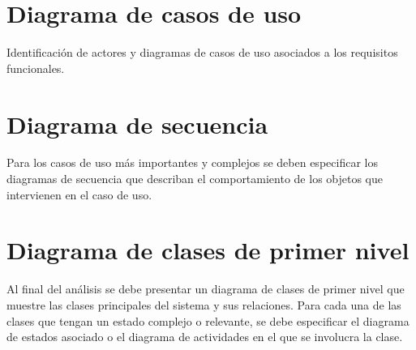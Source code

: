 
\section{Diagrama de casos de uso}

Identificación de actores y diagramas de casos de uso asociados a los requisitos funcionales.

\section{Diagrama de secuencia}
Para los casos de uso más importantes y complejos se deben especificar los diagramas de secuencia que describan el comportamiento de los objetos que intervienen en el caso de uso.
\section{Diagrama de clases de primer nivel}

Al final del análisis se debe presentar un diagrama de clases de primer nivel que muestre las clases principales del sistema y sus relaciones.
Para cada una de las clases que tengan un estado complejo o relevante, se debe especificar el diagrama de estados asociado o el diagrama de actividades en el que se involucra la clase.